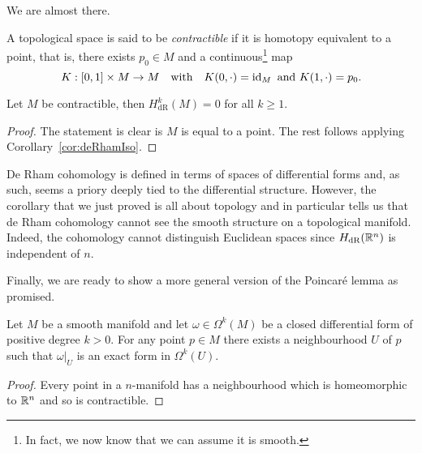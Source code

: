 We are almost there.

\begin{definition}
  A topological space is said to be \emph{contractible} if it is homotopy equivalent to a point, that is, there exists $p_0\in M$ and a continuous\footnote{In fact, we now know that we can assume it is smooth.} map
  \begin{equation}
    K:[0,1]\times M \to M
    \quad\mbox{with}\quad
    K(0, \cdot) = \operatorname{id}_M
    \mbox{ and }
    K(1, \cdot) = p_0.
  \end{equation}
\end{definition}

\begin{corollary}
  Let $M$ be contractible, then $H^k_{\mathrm{dR}}(M)=0$ for all $k\geq 1$.
\end{corollary}
\begin{proof}
The statement is clear is $M$ is equal to a point.
The rest follows applying Corollary~\ref{cor:deRhamIso}.
\end{proof}

\begin{remark}
De Rham cohomology is defined in terms of spaces of differential forms and, as such, seems a priory deeply tied to the differential structure.
However, the corollary that we just proved is all about topology and in particular tells us that de Rham cohomology cannot see the smooth structure on a topological manifold.
Indeed, the cohomology cannot distinguish Euclidean spaces since $H_{\mathrm{dR}}(\mathbb{R}^n)$ is independent of $n$. 
\end{remark}

Finally, we are ready to show a more general version of the Poincar\'e lemma as promised.

\begin{corollary}\label{cor:plemma}
  Let $M$ be a smooth manifold and let $\omega\in\Omega^k(M)$ be a closed differential form of positive degree $k>0$.
  For any point $p\in M$ there exists a neighbourhood $U$ of $p$ such that $\omega|_U$ is an exact form in $\Omega^k(U)$.
\end{corollary}
\begin{proof}
Every point in a $n$-manifold has a neighbourhood which is homeomorphic to $\mathbb{R}^n$ and so is contractible.
\end{proof}